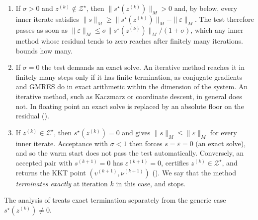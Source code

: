 \documentclass[11pt]{article}
\begin{document}
\begin{enumerate}
    \item If $\sigma > 0$ and $z^{(k)} \notin \mathcal{Z}^\star$, then $\|s^\star(z^{(k)})\|_M > 0$ and, by  below, every inner iterate satisfies $\|s\|_M \geq \|s^\star(z^{(k)})\|_M - \|\varepsilon\|_M$.
    The test therefore passes as soon as $\|\varepsilon\|_M \leq \sigma\|s^\star(z^{(k)})\|_M/(1 + \sigma)$, which any inner method whose residual tends to zero reaches after finitely many iterations.
     bounds how many.
    \item If $\sigma = 0$ the test demands an exact solve.
    An iterative method reaches it in finitely many steps only if it has finite termination, as conjugate gradients and GMRES do in exact arithmetic within the dimension of the system.
    An iterative method, such as Kaczmarz or coordinate descent, in general does not.
    In floating point an exact solve is replaced by an absolute floor on the residual ().
    \item If $z^{(k)} \in \mathcal{Z}^\star$, then $s^\star(z^{(k)}) = 0$ and  gives $\|s\|_M \leq \|\varepsilon\|_M$ for every inner iterate.
    Acceptance with $\sigma < 1$ then forces $s = \varepsilon = 0$ (an exact solve), and so the warm start does not pass the test automatically.
    Conversely, an accepted pair with $s^{(k+1)} = 0$ has $\varepsilon^{(k+1)} = 0$, certifies $z^{(k)} \in \mathcal{Z}^\star$, and returns the KKT point $(v^{(k+1)}, \nu^{(k+1)})$ ().
    We say that the method \emph{terminates exactly} at iteration $k$ in this case, and  stops.
\end{enumerate}
The analysis of  treats exact termination separately from the generic case $s^\star(z^{(k)}) \neq 0$.
\end{document}
